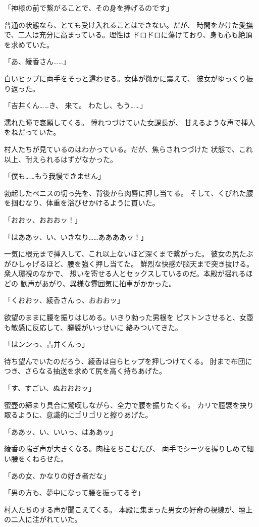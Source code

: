 ﻿\documentclass[
    book,tate,
    line_length=30zw,
    jafontsize=12pt,
    paper=b5j,
    landscape,
    ]{jlreq}
\begin{document}
「神様の前で繋がることで、その身を捧げるのです」

普通の状態なら、とても受け入れることはできない。だが、
時間をかけた愛撫で、二人は充分に高まっている。理性は
ドロドロに蕩けており、身も心も絶頂を求めていた。

「あ、綾香さん……」

白いヒップに両手をそっと這わせる。女体が微かに震えて、
彼女がゆっくり振り返った。

「吉井くん……き、 来て。 わたし、もう……」

濡れた瞳で哀願してくる。 憧れつづけていた女課長が、
甘えるような声で挿入をねだっていた。

村人たちが見ているのはわかっている。だが、焦らされつづけた
状態で、これ以上、耐えられるはずがなかった。

「僕も……もう我慢できません」

勃起したペニスの切っ先を、背後から肉唇に押し当てる。
そして、くびれた腰を掴むなり、体重を浴びせかけるように貫いた。

「おおッ、おおおッ！」

「はああッ、い、いきなり……ああああッ！」

一気に根元まで挿入して、これ以上ないほど深くまで繋がった。
彼女の尻たぶがひしゃげるほど、腰を強く押し当てた。 
鮮烈な快感が脳天まで突き抜ける。衆人環視のなかで、
想いを寄せる人とセックスしているのだ。本殿が揺れるほどの
歓声があがり、異様な雰囲気に拍車がかかった。

「くおおッ、綾香さんっ、おおおッ」

欲望のままに腰を振りはじめる。いきり勃った男根を
ピストンさせると、女壺も敏感に反応して、膣襞がいっせいに
絡みついてきた。

「はンンっ、吉井くんっ」

待ち望んでいたのだろう、綾香は自らヒップを押しつけてくる。
肘まで布団につき、さらなる抽送を求めて尻を高く持ちあげた。

「す、すごい、ぬおおおッ」

蜜壺の締まり具合に驚嘆しながら、全力で腰を振りたくる。
カリで膣襞を抉り取るように、意識的にゴリゴリと擦りあげた。

「ああッ、い、いいっ、はああッ」

綾香の喘ぎ声が大きくなる。肉柱をちこむたび、
両手でシーツを握りしめて細い腰をくねらせた。

「あの女、かなりの好き者だな」

「男の方も、夢中になって腰を振ってるぞ」

村人たちのする声が聞こえてくる。
本殿に集まった男女の好奇の視線が、壇上の二人に注がれていた。
\end{document}
